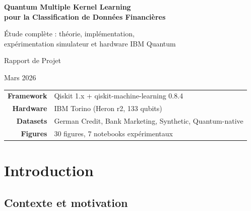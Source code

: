 \documentclass[12pt,a4paper]{article}
\begin{document}
\begin{titlepage}
\centering
\vspace*{2cm}

{\LARGE\bfseries Quantum Multiple Kernel Learning\\[0.3cm]
pour la Classification de Données Financières}

\vspace{1.5cm}

{\Large Étude complète : théorie, implémentation,\\
expérimentation simulateur et hardware IBM Quantum}

\vspace{2cm}

{\large Rapport de Projet}

\vspace{1cm}

{\large Mars 2026}

\vspace{3cm}

\begin{tabular}{rl}
\textbf{Framework} & Qiskit 1.x + qiskit-machine-learning 0.8.4 \\
\textbf{Hardware}   & IBM Torino (Heron r2, 133 qubits) \\
\textbf{Datasets}   & German Credit, Bank Marketing, Synthetic, Quantum-native \\
\textbf{Figures}     & 30 figures, 7 notebooks expérimentaux \\
\end{tabular}

\vfill
\end{titlepage}

\tableofcontents
\newpage

\section{Introduction}
\label{sec:introduction}

\subsection{Contexte et motivation}
\end{document}
